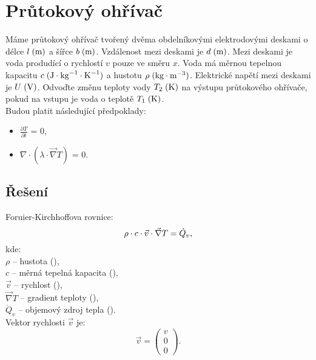 \documentclass{article}
\begin{document}
\maketitle
\tableofcontents
\newpage



\section{ Průtokový ohřívač \spicy \spicy \spicy \spicy}
Máme průtokový ohřívač tvořený dvěma obdelníkovými elektrodovými deskami o délce $l \; (\textrm{m})$ a šířce $b \; (\textrm{m})$. Vzdálenost mezi deskami je $d \; (\textrm{m})$. Mezi deskami je voda produdící o rychlostí $v$ pouze ve směru $x$. Voda má měrnou tepelnou kapacitu $c \; (\textrm{J} \cdot \textrm{kg}^{-1} \cdot \textrm{K}^{-1})$ a hustotu $\rho \; (\textrm{kg} \cdot \textrm{m}^{-3})$. Elektrické napětí mezi deskami je $U \; (\textrm{V})$. Odvoďte změnu teploty vody $T_2 \; (\textrm{K})$ na výstupu průtokového ohřívače, pokud na vstupu je voda o teplotě $T_1 \; (\textrm{K})$.\\

Budou platit následující předpoklady:
\begin{itemize}
    \item $\frac{\partial T}{\partial t}$ = 0,
    \item $\nabla \cdot (\lambda \cdot \vec{\nabla} T)$ = 0.
\end{itemize}


\subsection{Řešení}
Foruier-Kirchhoffova rovnice:
\begin{equation}
    \rho \cdot c \cdot \vec{v} \cdot \vec{\nabla} T = \dot{Q}_v,
    \unit{(\ueqWandMinvcu)}
\end{equation}
kde:\\
$\rho$ -- hustota (\ueqKGandMinvcu),\\
$c$ -- měrná tepelná kapacita (\ueqJandKGinvKinv),\\
$\vec{v}$ -- rychlost (\ueqMandSinv),\\
$\vec{\nabla} T$ -- gradient teploty (\ueqKandMinv),\\
$\dot{Q}_v$ -- objemový zdroj tepla (\ueqWandMinvcu).\\

Vektor rychlosti $\vec{v}$ je:
$$
    \vec{v} = \begin{pmatrix} v \\ 0 \\ 0 \end{pmatrix}.
$$
\end{document}
